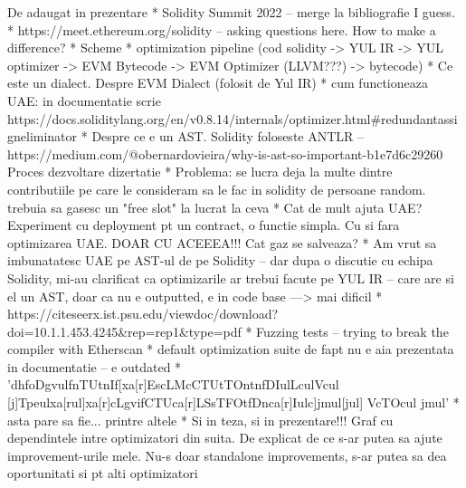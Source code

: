 De adaugat in prezentare
* Solidity Summit 2022 – merge la bibliografie I guess.
* https://meet.ethereum.org/solidity – asking questions here. How to make a difference?
* Scheme
  * optimization pipeline (cod solidity -> YUL IR -> YUL optimizer -> EVM Bytecode -> EVM Optimizer (LLVM???) -> bytecode)
* Ce este un dialect. Despre EVM Dialect (folosit de Yul IR)
* cum functioneaza UAE: in documentatie scrie https://docs.soliditylang.org/en/v0.8.14/internals/optimizer.html#redundantassigneliminator
* Despre ce e un AST. Solidity foloseste ANTLR – https://medium.com/@obernardovieira/why-is-ast-so-important-b1e7d6c29260
Proces dezvoltare dizertatie
* Problema: se lucra deja la multe dintre contributiile pe care le consideram sa le fac in solidity de persoane random. trebuia sa gasesc un "free slot" la lucrat la ceva
* Cat de mult ajuta UAE? Experiment cu deployment pt un contract, o functie simpla. Cu si fara optimizarea UAE. DOAR CU ACEEEA!!! Cat gaz se salveaza?
* Am vrut sa imbunatatesc UAE pe AST-ul de pe Solidity – dar dupa o discutie cu echipa Solidity, mi-au clarificat ca optimizarile ar trebui facute pe YUL IR – care are si el un AST, doar ca nu e outputted, e in code base ---> mai dificil
* https://citeseerx.ist.psu.edu/viewdoc/download?doi=10.1.1.453.4245&rep=rep1&type=pdf 
* Fuzzing tests – trying to break the compiler with Etherscan
* default optimization suite de fapt nu e aia prezentata in documentatie – e outdated
  * 'dhfoDgvulfnTUtnIf[xa[r]EscLMcCTUtTOntnfDIulLculVcul [j]Tpeulxa[rul]xa[r]cLgvifCTUca[r]LSsTFOtfDnca[r]Iulc]jmul[jul] VcTOcul jmul'
  * asta pare sa fie... printre altele
* Si in teza, si in prezentare!!! Graf cu dependintele intre optimizatori din suita. De explicat de ce s-ar putea sa ajute improvement-urile mele. Nu-s doar standalone improvements, s-ar putea sa dea oportunitati si pt alti optimizatori

